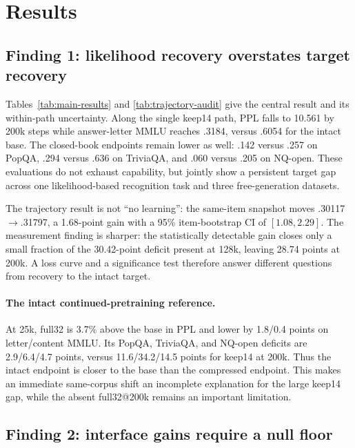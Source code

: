 \section{Results}
\label{sec:experiments}

\subsection{Finding 1: likelihood recovery overstates target recovery}




Tables~\ref{tab:main-results} and \ref{tab:trajectory-audit} give the central
result and its within-path uncertainty.
Along the single keep14 path, PPL falls to 10.561 by 200k steps while
answer-letter MMLU reaches .3184, versus .6054 for the intact base. The
closed-book endpoints remain lower as well: .142 versus .257 on PopQA, .294
versus .636 on TriviaQA, and .060 versus .205 on NQ-open. These evaluations do
not exhaust capability, but jointly show a persistent target gap across one
likelihood-based recognition task and three free-generation datasets.

The trajectory result is not ``no learning'': the same-item snapshot moves
.30117$\rightarrow$.31797, a 1.68-point gain with a 95\% item-bootstrap CI of
$[1.08,2.29]$. The measurement
finding is sharper: the statistically detectable gain closes only a small
fraction of the 30.42-point deficit present at 128k, leaving 28.74 points at
200k. A loss curve and a significance test therefore answer different
questions from recovery to the intact target.

\paragraph{The intact continued-pretraining reference.}
At 25k, full32 is 3.7\% above the base in PPL and lower by 1.8/0.4 points on
letter/content MMLU. Its PopQA, TriviaQA, and NQ-open deficits are
2.9/6.4/4.7 points, versus 11.6/34.2/14.5 points for keep14 at 200k. Thus the
intact endpoint is closer to the base than the compressed
endpoint. This makes an immediate same-corpus shift an incomplete explanation
for the large keep14 gap, while the absent full32@200k remains an important limitation.

\subsection{Finding 2: interface gains require a null floor}


